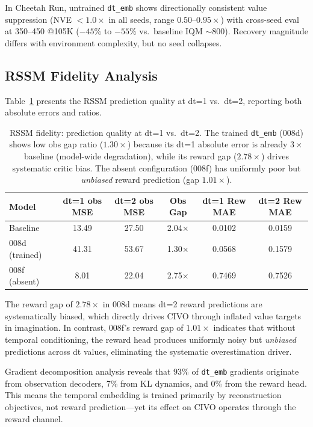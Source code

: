 \documentclass[10pt,letterpaper]{article}
\begin{document}
In Cheetah Run, untrained \texttt{dt\_emb} shows directionally consistent value suppression (NVE $<1.0\times$ in all seeds, range $0.50$--$0.95\times$) with cross-seed eval at 350--450 @105K ($-45\%$ to $-55\%$ vs.\ baseline IQM $\sim$800).
Recovery magnitude differs with environment complexity, but no seed collapses.

\subsection{RSSM Fidelity Analysis}
\label{sec:rssm}

Table~\ref{tab:rssm_fidelity} presents the RSSM prediction quality at dt=1 vs.\ dt=2, reporting both absolute errors and ratios.

\begin{table}[h]
\centering
\caption{RSSM fidelity: prediction quality at dt=1 vs.\ dt=2. The trained \texttt{dt\_emb} (008d) shows low obs gap ratio ($1.30\times$) because its dt=1 absolute error is already $3\times$ baseline (model-wide degradation), while its reward gap ($2.78\times$) drives systematic critic bias. The absent configuration (008f) has uniformly poor but \emph{unbiased} reward prediction (gap $1.01\times$).}
\label{tab:rssm_fidelity}
\begin{tabular}{lccccc}
\toprule
Model & dt=1 obs MSE & dt=2 obs MSE & Obs Gap & dt=1 Rew MAE & dt=2 Rew MAE \\
\midrule
Baseline & 13.49 & 27.50 & 2.04$\times$ & 0.0102 & 0.0159 \\
008d (trained) & 41.31 & 53.67 & 1.30$\times$ & 0.0568 & 0.1579 \\
008f (absent) & 8.01 & 22.04 & 2.75$\times$ & 0.7469 & 0.7526 \\
\bottomrule
\end{tabular}
\end{table}

The reward gap of $2.78\times$ in 008d means dt=2 reward predictions are systematically biased, which directly drives CIVO through inflated value targets in imagination.
In contrast, 008f's reward gap of $1.01\times$ indicates that without temporal conditioning, the reward head produces uniformly noisy but \emph{unbiased} predictions across dt values, eliminating the systematic overestimation driver.

Gradient decomposition analysis reveals that 93\% of \texttt{dt\_emb} gradients originate from observation decoders, 7\% from KL dynamics, and 0\% from the reward head.
This means the temporal embedding is trained primarily by reconstruction objectives, not reward prediction---yet its effect on CIVO operates through the reward channel.
\end{document}
